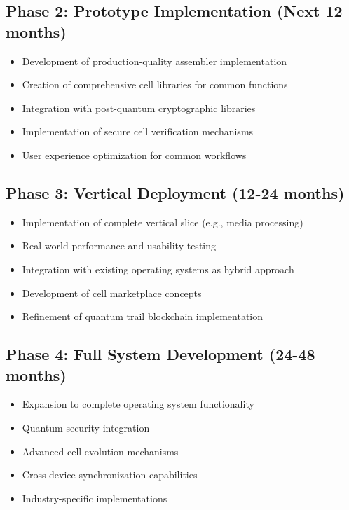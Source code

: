 \documentclass[11pt,a4paper]{article}
\begin{document}
\subsection{Phase 2: Prototype Implementation (Next 12 months)}

\begin{itemize}
    \item Development of production-quality assembler implementation
    \item Creation of comprehensive cell libraries for common functions
    \item Integration with post-quantum cryptographic libraries
    \item Implementation of secure cell verification mechanisms
    \item User experience optimization for common workflows
\end{itemize}

\subsection{Phase 3: Vertical Deployment (12-24 months)}

\begin{itemize}
    \item Implementation of complete vertical slice (e.g., media processing)
    \item Real-world performance and usability testing
    \item Integration with existing operating systems as hybrid approach
    \item Development of cell marketplace concepts
    \item Refinement of quantum trail blockchain implementation
\end{itemize}

\subsection{Phase 4: Full System Development (24-48 months)}

\begin{itemize}
    \item Expansion to complete operating system functionality
    \item Quantum security integration
    \item Advanced cell evolution mechanisms
    \item Cross-device synchronization capabilities
    \item Industry-specific implementations
\end{itemize}
\end{document}
